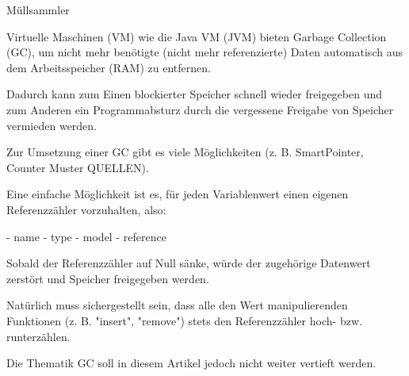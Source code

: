 
Müllsammler

Virtuelle Maschinen (VM) wie die Java VM (JVM)
bieten Garbage Collection (GC), um nicht mehr
benötigte (nicht mehr referenzierte) Daten
automatisch aus dem Arbeitsspeicher (RAM) zu entfernen.

Dadurch kann zum Einen blockierter Speicher schnell wieder
freigegeben und zum Anderen ein Programmabsturz durch
die vergessene Freigabe von Speicher vermieden werden.

Zur Umsetzung einer GC gibt es viele Möglichkeiten
(z. B. SmartPointer, Counter Muster QUELLEN).

Eine einfache Möglichkeit ist es, für jeden Variablenwert
einen eigenen Referenzzähler vorzuhalten, also:

- name
- type
- model
- reference

Sobald der Referenzzähler auf Null sänke, würde der
zugehörige Datenwert zerstört und Speicher freigegeben werden.

Natürlich muss sichergestellt sein, dass alle den Wert
manipulierenden Funktionen (z. B. "insert", "remove")
stets den Referenzzähler hoch- bzw. runterzählen.

Die Thematik GC soll in diesem Artikel jedoch nicht
weiter vertieft werden.
